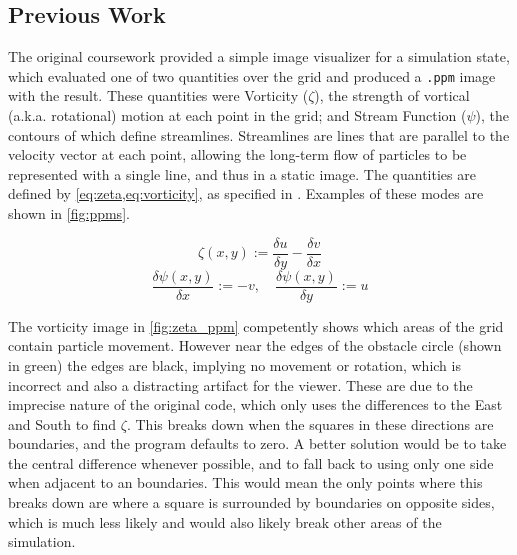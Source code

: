 \subsection{Previous Work}
The original coursework\cite{modules:CS257Coursework} provided a simple image visualizer for a simulation state, which evaluated one of two quantities over the grid and produced a \texttt{.ppm} image with the result.
These quantities were Vorticity ($\zeta$), the strength of vortical (a.k.a. rotational) motion at each point in the grid; and Stream Function ($\psi$), the contours of which define streamlines.
Streamlines are lines that are parallel to the velocity vector at each point, allowing the long-term flow of particles to be represented with a single line, and thus in a static image.\cite{NASADefinitionStreamlines}
The quantities are defined by \cref{eq:zeta,eq:vorticity}, as specified in \cite{book:griebel1998numerical}.
Examples of these modes are shown in \cref{fig:ppms}.

\begin{equation}
    \zeta(x,y) := \frac{\delta{u}}{\delta{y}} - \frac{\delta{v}}{\delta{x}}
    \label{eq:zeta}
\end{equation}
\begin{equation}
    \frac{\delta{\psi}(x,y)}{\delta{x}} := -v,\quad \frac{\delta{\psi}(x,y)}{\delta{y}} := u
    \label{eq:vorticity}
\end{equation}


The vorticity image in \cref{fig:zeta_ppm} competently shows which areas of the grid contain particle movement.
However near the edges of the obstacle circle (shown in green) the edges are black, implying no movement or rotation, which is incorrect and also a distracting artifact for the viewer.
These are due to the imprecise nature of the original code, which only uses the differences to the East and South to find $\zeta$.
This breaks down when the squares in these directions are boundaries, and the program defaults to zero.
A better solution would be to take the central difference whenever possible, and to fall back to using only one side when adjacent to an boundaries.
This would mean the only points where this breaks down are where a square is surrounded by boundaries on opposite sides, which is much less likely and would also likely break other areas of the simulation.


